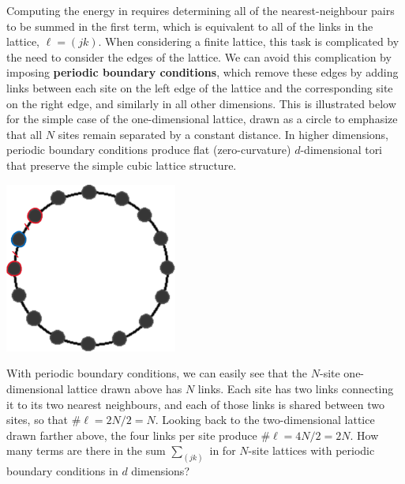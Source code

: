 Computing the energy in  requires determining all of the nearest-neighbour pairs to be summed in the first term, which is equivalent to all of the links in the lattice, $\ell = (jk)$.
When considering a finite lattice, this task is complicated by the need to consider the edges of the lattice.
We can avoid this complication by imposing \textbf{periodic boundary conditions}, which remove these edges by adding links between each site on the left edge of the lattice and the corresponding site on the right edge, and similarly in all other dimensions.
This is illustrated below for the simple case of the one-dimensional lattice, drawn as a circle to emphasize that all $N$ sites remain separated by a constant distance.
In higher dimensions, periodic boundary conditions produce flat (zero-curvature) $d$-dimensional tori that preserve the simple cubic lattice structure. \\[-24 pt]
\begin{center}\includegraphics[width=0.425\textwidth]{figs/unit09_lattice_1d.pdf}\end{center} %

With periodic boundary conditions, we can easily see that the $N$-site one-dimensional lattice drawn above has $N$ links.
Each site has two links connecting it to its two nearest neighbours, and each of those links is shared between two sites, so that $\#\ell = 2N / 2 = N$.
Looking back to the two-dimensional lattice drawn farther above, the four links per site produce $\#\ell = 4N / 2 = 2N$.
How many terms are there in the sum $\sum_{(jk)}$ in  for $N$-site lattices with periodic boundary conditions in $d$ dimensions?
\begin{mdframed}
  \ \\[50 pt]
\end{mdframed}

